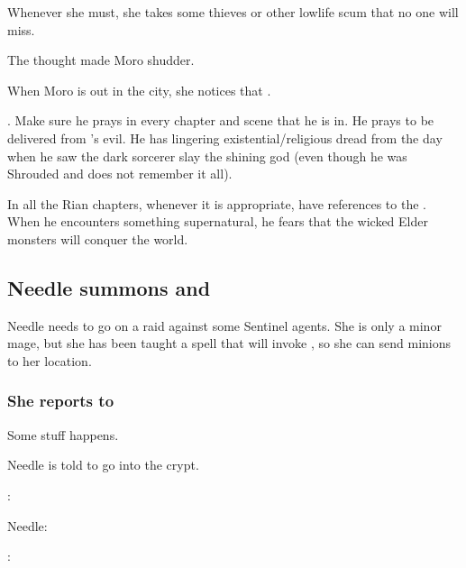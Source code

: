 Whenever she must, she takes some thieves or other lowlife scum that no one will miss. 

\begin{prose}
  The thought made Moro shudder.  
\end{prose}

When Moro is out in the city, she notices that . 
    
.
Make sure he prays in every chapter and scene that he is in.
He prays to be delivered from \Isphet's evil. 
He has lingering existential/religious dread from the day when he saw the dark sorcerer slay the shining god (even though he was Shrouded and does not remember it all). 

In all the Rian chapters, whenever it is appropriate, have references to the . 
When he encounters something supernatural, he fears that the wicked Elder monsters will conquer the world. 









\subsection{Needle summons \banes and \banerats}
Needle needs to go on a raid against some Sentinel agents. 
She is only a minor mage, but she has been taught a spell that will invoke \Achsah{}, so she can send minions to her location. 





\subsubsection{She reports to \Achsah}
Some stuff happens. 

Needle is told to go into the crypt. 

\Achsah: 

Needle: 

\Achsah: 

